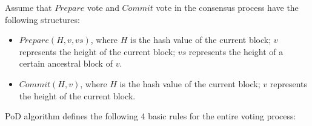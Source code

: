 Assume that $Prepare$ vote and $Commit$ vote in the consensus process have the following structures:


\begin{itemize}
\item $Prepare(H, v, vs)$, where $H$ is the hash value of the current block; $v$ represents the height of the current block; $vs$ represents the height of a certain ancestral block of $v$.

\item $Commit(H, v)$, where $H$ is the hash value of the current block; $v$ represents the height of the current block.
\end{itemize}

PoD algorithm defines the following 4 basic rules for the entire voting process:

